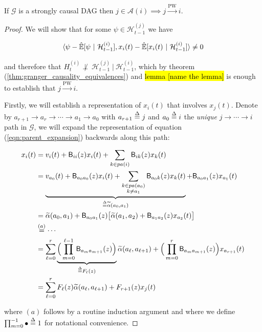 \documentclass[12pt]{article}
\def\pwgc{\overset{\text{PW}}{\rightarrow}}  %
\def\gcg{\mathcal{G}}  %
\def\B{\mathsf{B}}  %
\def\H{\mathcal{H}}  %
\newcommand{\linE}[2]{\hat{\E}[#1\ |\ #2]}  %
\newcommand{\pa}[1]{pa(#1)}  %
\newcommand{\anc}[1]{\mathcal{A}(#1)}  %
\newcommand{\wtalpha}[2]{\widetilde{\alpha}(#1, #2)}  %
\newcommand{\gcgpath}[2]{#1 \rightarrow \cdots \rightarrow #2}  %
\begin{document}
\begin{proposition}
  \label{prop:pwgc_anc}
  If $\gcg$ is a strongly causal DAG then $j \in \anc{i} \implies j \pwgc i$.
\end{proposition}
\begin{proof}
  We will show that for some $\psi \in \H_{t - 1}^{(j)}$ we have

  \begin{equation}
    \label{eqn:cond_ortho_proof}
    \inner{\psi - \linE{\psi}{\H_{t - 1}^{(i)}}}{x_i(t) - \linE{x_i(t)}{\H_{t - 1}^{(i)}}} \ne 0
  \end{equation}

  and therefore that $H_t^{(i)} \not\perp\ \H_{t - 1}^{(j)}\ |\ \H_{t - 1}^{(i)}$, which by theorem (\ref{thm:granger_causality_equivalences}) and \hl{lemma [name the lemma]} is enough to establish that $j \pwgc i$.

  Firstly, we will establish a representation of $x_i(t)$ that involves $x_j(t)$.  Denote by $a_{r + 1} \rightarrow a_r \rightarrow \cdots \rightarrow a_1 \rightarrow a_0$ with $a_{r + 1} \overset{\Delta}{=} j$ and $a_0 \overset{\Delta}{=} i$ the \textit{unique} $\gcgpath{j}{i}$ path in $\gcg$, we will expand the representation of equation (\ref{eqn:parent_expansion}) backwards along this path:

  \begin{align*}
    x_i(t) &= v_i(t) + \B_{ii}(z) x_i(t) + \sum_{k \in \pa{i}}\B_{ik}(z) x_k(t)\\
           &= \underbrace{v_{a_0}(t) + \B_{a_0a_0}(z) x_i(t) + \sum_{\substack{k \in \pa{a_0} \\ k \ne a_1}}\B_{a_0 k}(z) x_k(t)}_{\defeq \wtalpha{a_0}{a_1}} + \B_{a_0a_1}(z)x_{a_1}(t)\\
           &= \wtalpha{a_0}{a_1} + \B_{a_0a_1}(z)\big[\wtalpha{a_1}{a_2} + \B_{a_1a_2}(z)x_{a_2}(t) \big]\\
           &\overset{(a)}{=} \cdots\\
           &= \sum_{\ell = 0}^r \underbrace{\Big(\prod_{m = 0}^{\ell - 1} \B_{a_m a_{m + 1}}(z) \Big)}_{\defeq F_\ell(z)} \wtalpha{a_\ell}{a_{\ell + 1}} + \Big(\prod_{m = 0}^{r}\B_{a_m a_{m + 1}}(z)\Big)x_{a_{r + 1}}(t)\\
           &= \sum_{\ell = 0}^r F_\ell(z) \wtalpha{a_\ell}{a_{\ell + 1}} + F_{r + 1}(z) x_j(t)
  \end{align*}

  where $(a)$ follows by a routine induction argument and where we define $\prod_{m = 0}^{-1} \bullet \overset{\Delta}{=} 1$ for notational convenience.


\end{proof}
\end{document}
